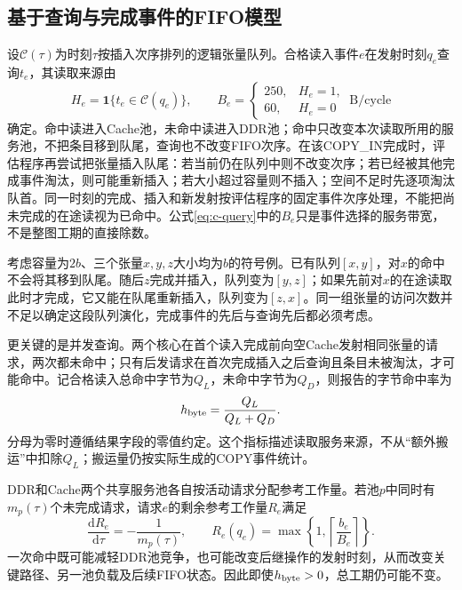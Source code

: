 \subsection{基于查询与完成事件的FIFO模型}
设$\mathcal C(\tau)$为时刻$\tau$按插入次序排列的逻辑张量队列。合格读入事件$e$在发射时刻$q_e$查询$t_e$，其读取来源由
\begin{equation}
H_e=\mathbf 1\{t_e\in\mathcal C(q_e)\},\qquad
B_e=\begin{cases}250,&H_e=1,\\60,&H_e=0\end{cases}\ \mathrm{B/cycle}
\label{eq:c-query}
\end{equation}
确定。命中读进入Cache池，未命中读进入DDR池；命中只改变本次读取所用的服务池，不把条目移到队尾，查询也不改变FIFO次序。在该COPY\_IN完成时，评估程序再尝试把张量插入队尾：若当前仍在队列中则不改变次序；若已经被其他完成事件淘汰，则可能重新插入；若大小超过容量则不插入；空间不足时先逐项淘汰队首。同一时刻的完成、插入和新发射按评估程序的固定事件次序处理，不能把尚未完成的在途读视为已命中。公式\eqref{eq:c-query}中的$B_e$只是事件选择的服务带宽，不是整图工期的直接除数。

考虑容量为$2b$、三个张量$x,y,z$大小均为$b$的符号例。已有队列$[x,y]$，对$x$的命中不会将其移到队尾。随后$z$完成并插入，队列变为$[y,z]$；如果先前对$x$的在途读取此时才完成，它又能在队尾重新插入，队列变为$[z,x]$。同一组张量的访问次数并不足以确定这段队列演化，完成事件的先后与查询先后都必须考虑。

更关键的是并发查询。两个核心在首个读入完成前向空Cache发射相同张量的请求，两次都未命中；只有后发请求在首次完成插入之后查询且条目未被淘汰，才可能命中。记合格读入总命中字节为$Q_L$，未命中字节为$Q_D$，则报告的字节命中率为
\begin{equation}
h_{\rm byte}=\frac{Q_L}{Q_L+Q_D}.
\label{eq:hit-rate}
\end{equation}
分母为零时遵循结果字段的零值约定。这个指标描述读取服务来源，不从“额外搬运”中扣除$Q_L$；搬运量仍按实际生成的COPY事件统计。

DDR和Cache两个共享服务池各自按活动请求分配参考工作量。若池$p$中同时有$m_p(\tau)$个未完成请求，请求$e$的剩余参考工作量$R_e$满足
\begin{equation}
\frac{\mathrm dR_e}{\mathrm d\tau}=-\frac{1}{m_p(\tau)},\qquad
R_e(q_e)=\max\left\{1,\left\lceil\frac{b_e}{B_e}\right\rceil\right\}.
\label{eq:c-service}
\end{equation}
一次命中既可能减轻DDR池竞争，也可能改变后继操作的发射时刻，从而改变关键路径、另一池负载及后续FIFO状态。因此即使$h_{\rm byte}>0$，总工期仍可能不变。

